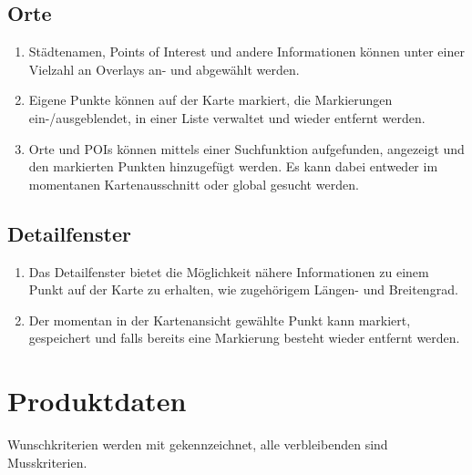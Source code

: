 \documentclass[10pt]{scrreprt}
\begin{document}
\section{Orte}
\begin{enumerate}[leftmargin=2cm,resume]
\item Städtenamen, Points of Interest und andere Informationen können unter einer Vielzahl an Overlays an- und abgewählt werden.
\item \W Eigene Punkte können auf der Karte markiert, die Markierungen ein-/ausgeblendet, in einer Liste verwaltet und wieder entfernt werden.
\item \W Orte und POIs können mittels einer Suchfunktion aufgefunden, angezeigt und den markierten Punkten hinzugefügt werden. Es kann dabei entweder im momentanen Kartenausschnitt oder global gesucht werden.
\end{enumerate}

\section{Detailfenster}
\begin{enumerate}[leftmargin=2cm,resume]
\item Das Detailfenster bietet die Möglichkeit nähere Informationen zu einem Punkt auf der Karte zu erhalten, wie zugehörigem Längen- und Breitengrad.
\item \W Der momentan in der Kartenansicht gewählte Punkt kann markiert,  gespeichert und falls bereits eine Markierung besteht wieder entfernt werden.
\end{enumerate}



\chapter{Produktdaten}

\renewcommand{\labelenumi}{\textbf{/D\numprint{\theenumi}0/}}
Wunschkriterien werden mit \W  gekennzeichnet, alle verbleibenden sind Musskriterien.\\

\vspace{5mm}
\end{document}
